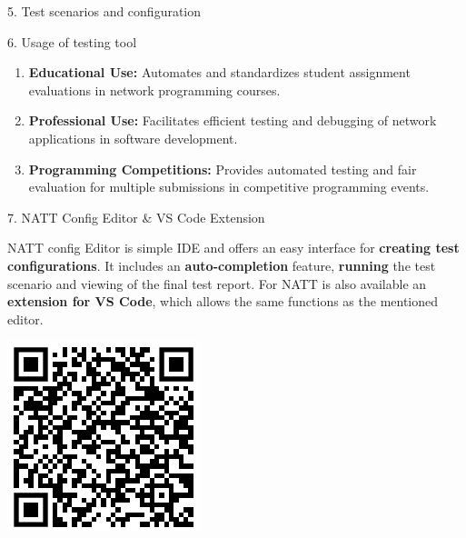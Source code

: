 \documentclass[final]{beamer}
\newlength{\colwidth}
\begin{document}
\begin{frame}[t]
\begin{columns}[t]
\begin{column}{\colwidth}
\begin{block}{5. Test scenarios and configuration}
  \end{block}

  \begin{exampleblock}{6. Usage of testing tool}

    \begin{enumerate}
      \item \textbf{Educational Use:} Automates and standardizes student assignment evaluations in network programming courses.
      
      \item \textbf{Professional Use:} Facilitates efficient testing and debugging of network applications in software development.
      
      \item \textbf{Programming Competitions:} Provides automated testing and fair evaluation for multiple submissions in competitive programming events.
   \end{enumerate}
 
  \end{exampleblock}

  \begin{block}{7. NATT Config Editor \& VS Code Extension}

    \begin{minipage}{0.7\textwidth}
      NATT config Editor is simple IDE and offers an easy interface for \textbf{creating test configurations}. It includes an 
      \textbf{auto-completion} feature, \textbf{running} the test scenario and viewing of the final test report. For NATT is 
      also available an \textbf{extension for VS Code}, which allows the same functions as the mentioned editor.
    \end{minipage}
    \hfill
    \noindent\begin{minipage}{0.25\textwidth}
      \includegraphics[width=\textwidth]{./imgs/extension_qr.png}
    \end{minipage}


\end{block}
\end{column}
\end{columns}
\end{frame}
\end{document}
